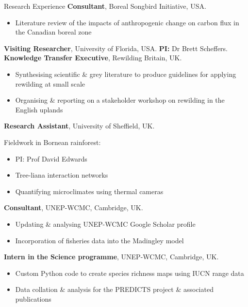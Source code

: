 \renewcommand\labelitemi{$\diamond$}

\begin{rubric}{Research Experience}
\entry*[2020]%
	\textbf{Consultant}, Boreal Songbird Initiative, USA.
	\begin{itemize}[topsep=0pt,itemsep=-1ex,partopsep=1ex,parsep=1ex]
	\item Literature review of the impacts of anthropogenic change on carbon flux in the Canadian boreal zone
	\end{itemize}
\entry*[2019]%
	\textbf{Visiting Researcher}, University of Florida, USA. \textbf{PI:} Dr Brett Scheffers.
\entry*[2016]%
	\textbf{Knowledge Transfer Executive}, Rewilding Britain, UK.
	\begin{itemize}[topsep=0pt,itemsep=-1ex,partopsep=1ex,parsep=1ex]
	\item Synthesising scientific \& grey literature to produce guidelines for applying rewilding at small scale
	\item Organising \& reporting on a stakeholder workshop on rewilding in the English uplands \parencite{sandom_rewilding_2019}
	\end{itemize}
\entry*[2014]%
	\textbf{Research Assistant}, University of Sheffield, UK.
	\par Fieldwork in Bornean rainforest:
	\begin{itemize}[topsep=0pt,itemsep=-1ex,partopsep=1ex,parsep=1ex]
	\item PI: Prof David Edwards
	\item Tree-liana interaction networks \parencite{magrach_selective_2016}
	\item Quantifying microclimates using thermal cameras \parencite{scheffers_extreme_2017}
	\end{itemize}
\entry*[2013 -- 2014]%
	\textbf{Consultant}, UNEP-WCMC, Cambridge, UK.
	\begin{itemize}[topsep=0pt,itemsep=-1ex,partopsep=1ex,parsep=1ex]
	\item Updating \& analysing UNEP-WCMC Google Scholar profile
	\item Incorporation of fisheries data into the Madingley model
	\end{itemize}
\entry*[2013]%
	\textbf{Intern in the Science programme}, UNEP-WCMC, Cambridge, UK.
	\begin{itemize}[topsep=0pt,itemsep=-1ex,partopsep=1ex,parsep=1ex]
	\item Custom Python code to create species richness maps using IUCN range data
	\item  Data collation \& analysis for the PREDICTS project \& associated publications \parencite{newbold_global_2015, hudson_predicts_2014, hudson_database_2017}
	\end{itemize}
%
\end{rubric}